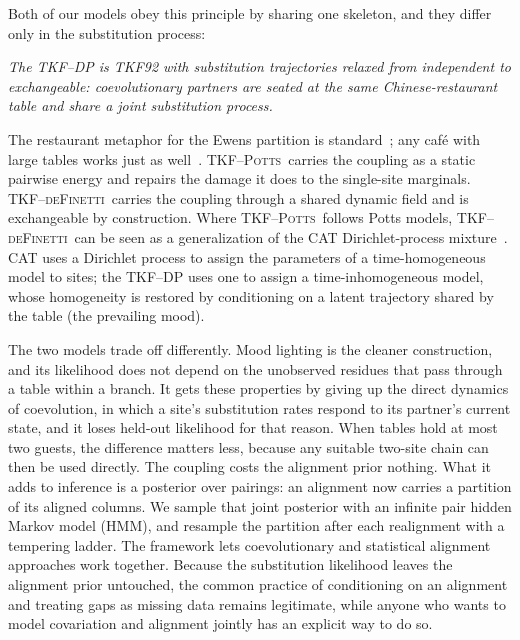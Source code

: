\documentclass[11pt]{article}
\newcommand{\Potts}{\textsc{TKF--Potts}}
\newcommand{\deF}{\textsc{TKF--deFinetti}}
\begin{document}
Both of our models obey this principle by sharing one skeleton, and they
differ only in the substitution process:
\begin{center}
\begin{minipage}{0.85\textwidth}
\emph{The TKF--DP is TKF92 with substitution trajectories relaxed from
independent to exchangeable: coevolutionary partners are seated at the same
Chinese-restaurant table and share a joint substitution process.}
\end{minipage}
\end{center}
The restaurant metaphor for the Ewens partition is standard~\citep{aldous1985,TehJorBea2006};
any caf\'e with large tables works just as well~\citep{AdhikariPitmanCRP}.
\Potts\ carries the coupling as a static pairwise energy and repairs the
damage it does to the single-site marginals. \deF\ carries the coupling
through a shared dynamic field and is exchangeable by construction. Where
\Potts\ follows Potts models, \deF\ can be seen as a generalization of the
CAT Dirichlet-process mixture~\citep{Lartillot2004}. CAT uses a Dirichlet
process to assign the parameters of a time-homogeneous model to sites; the
TKF--DP uses one to assign a time-inhomogeneous model, whose homogeneity is
restored by conditioning on a latent trajectory shared by the table (the
prevailing mood).

The two models trade off differently. Mood lighting is the cleaner
construction, and its likelihood does not depend on the unobserved residues
that pass through a table within a branch. It gets these properties by
giving up the direct dynamics of coevolution, in which a site's substitution
rates respond to its partner's current state, and it loses held-out
likelihood for that reason. When tables hold at most two guests, the
difference matters less, because any suitable two-site chain can then be used
directly. The coupling costs the alignment prior nothing. What it adds to
inference is a posterior over pairings: an alignment now carries a partition
of its aligned columns. We sample that joint posterior with an infinite pair
hidden Markov model (HMM), and resample the partition after each realignment
with a tempering ladder. The framework lets coevolutionary and statistical
alignment approaches work together. Because the substitution likelihood
leaves the alignment prior untouched, the common practice of conditioning on
an alignment and treating gaps as missing data remains legitimate, while
anyone who wants to model covariation and alignment jointly has an explicit
way to do so.
\end{document}
